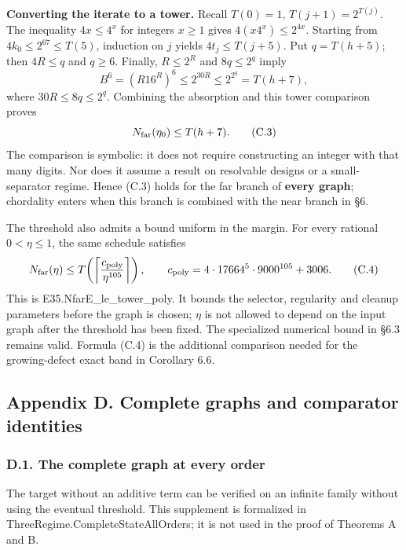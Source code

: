 \documentclass[english,11pt,a4paper]{article}
\begin{document}
\textbf{Converting the iterate to a tower.} Recall \(T(0)=1\), \(T(j+1)=2^{T(j)}\). The inequality \(4x\le4^x\) for integers \(x\ge1\) gives \(4(x4^x)\le2^{4x}\). Starting from \(4k_0\le2^{67}\le T(5)\), induction on \(j\) yields \(4t_j\le T(j+5)\). Put \(q=T(h+5)\); then \(4R\le q\) and \(q\ge6\). Finally, \(R\le2^R\) and \(8q\le2^q\) imply \[
B^6=(R16^R)^6\le2^{30R}\le2^{2^q}=T(h+7),
\] where \(30R\le8q\le2^q\). Combining the absorption and this tower comparison proves \[
N_{\rm far}(\eta_0)\le T(h+7).
\tag{C.3}
\] The comparison is symbolic: it does not require constructing an integer with that many digits. Nor does it assume a result on resolvable designs or a small-separator regime. Hence (C.3) holds for the far branch of \textbf{every graph}; chordality enters when this branch is combined with the near branch in §6.

The threshold also admits a bound uniform in the margin. For every rational \(0<\eta\le1\), the same schedule satisfies \[
N_{\rm far}(\eta)\le
T\!\left(\left\lceil\frac{c_{\rm poly}}{\eta^{105}}\right\rceil\right),
\qquad c_{\rm poly}=4\cdot17664^5\cdot9000^{105}+3006.
\tag{C.4}
\] This is {\ttfamily\small E35.\discretionary{\hbox{\ensuremath{\hookrightarrow}}}{}{}NfarE\_\discretionary{\hbox{\ensuremath{\hookrightarrow}}}{}{}le\_\discretionary{\hbox{\ensuremath{\hookrightarrow}}}{}{}tower\_\discretionary{\hbox{\ensuremath{\hookrightarrow}}}{}{}poly}. It bounds the selector, regularity and cleanup parameters before the graph is chosen; \(\eta\) is not allowed to depend on the input graph after the threshold has been fixed. The specialized numerical bound in §6.3 remains valid. Formula (C.4) is the additional comparison needed for the growing-defect exact band in Corollary 6.6.

\subsection{Appendix D. Complete graphs and comparator identities}\label{appendix-d.-complete-graphs-and-comparator-identities}

\subsubsection{D.1. The complete graph at every order}\label{d.1.-the-complete-graph-at-every-order}

The target without an additive term can be verified on an infinite family without using the eventual threshold. This supplement is formalized in {\ttfamily\small ThreeRegime.\discretionary{\hbox{\ensuremath{\hookrightarrow}}}{}{}CompleteStat\discretionary{\hbox{\ensuremath{\hookrightarrow}}}{}{}eAllOrders}; it is not used in the proof of Theorems A and B.
\end{document}
